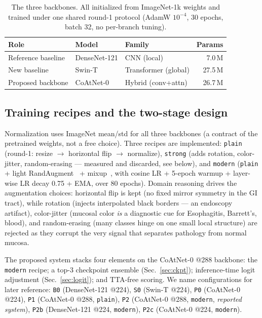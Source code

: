 \documentclass[11pt,a4paper]{article}
\begin{document}
\begin{table}[t]
\centering
\caption{The three backbones. All initialized from ImageNet-1k weights and
trained under one shared round-1 protocol (AdamW $10^{-4}$, 30 epochs, batch 32,
no per-branch tuning).}
\label{tab:models}
\begin{tabular}{lll r}
\toprule
Role & Model & Family & Params \\
\midrule
Reference baseline & DenseNet-121 & CNN (local) & 7.0\,M \\
New baseline & Swin-T & Transformer (global) & 27.5\,M \\
Proposed backbone & CoAtNet-0 & Hybrid (conv+attn) & 26.7\,M \\
\bottomrule
\end{tabular}
\end{table}

\subsection{Training recipes and the two-stage design}
Normalization uses ImageNet mean/std for all three backbones (a contract of the
pretrained weights, not a free choice). Three recipes are implemented:
\texttt{plain} (round-1: resize $\to$ horizontal flip $\to$ normalize),
\texttt{strong} (adds rotation, color-jitter, random-erasing --- measured and
discarded, see below), and \texttt{modern} (\texttt{plain} + light
RandAugment~\cite{randaugment} + mixup~\cite{mixup}, with cosine LR + 5-epoch
warmup + layer-wise LR decay 0.75 + EMA, over 80 epochs). Domain reasoning drives the augmentation choices: horizontal flip is
kept (no fixed mirror symmetry in the GI tract), while rotation (injects
interpolated black borders --- an endoscopy artifact), color-jitter (mucosal
color \emph{is} a diagnostic cue for Esophagitis, Barrett's, blood), and
random-erasing (many classes hinge on one small local structure) are rejected as
they corrupt the very signal that separates pathology from normal mucosa.

The proposed system stacks four elements on the CoAtNet-0 @288 backbone:
the \texttt{modern} recipe; a top-3 checkpoint ensemble (Sec.~\ref{sec:ckpt});
inference-time logit adjustment (Sec.~\ref{sec:logit}); and TTA-free scoring.
We name configurations for later reference:
\texttt{B0} (DenseNet-121 @224), \texttt{S0} (Swin-T @224),
\texttt{P0} (CoAtNet-0 @224), \texttt{P1} (CoAtNet-0 @288, \texttt{plain}),
\texttt{P2} (CoAtNet-0 @288, \texttt{modern}, \emph{reported system}),
\texttt{P2b} (DenseNet-121 @224, \texttt{modern}),
\texttt{P2c} (CoAtNet-0 @224, \texttt{modern}).
\end{document}
